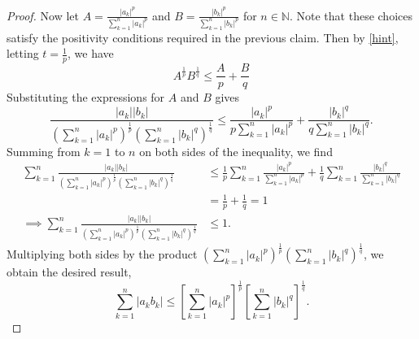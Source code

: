 \documentclass{article}
\begin{document}
\begin{proof}
	Now let $A=\frac{|a_k|^p}{\sum_{k=1}^{n}|a_k|^p}$ and $B = \frac{|b_k|^p}{\sum_{k=1}^{n}|b_k|^p}$ for $n\in\mathbb{N}$. Note that these choices satisfy the positivity conditions required in the previous claim. Then by \eqref{hint}, letting $t=\frac{1}{p}$, we have
	\begin{equation}
		A^\frac{1}{p}B^\frac{1}{q}\leq \frac{A}{p} + \frac{B}{q}
	\end{equation}
	Substituting the expressions for $A$ and $B$ gives 
	\begin{equation}
		\frac{|a_k||b_k|}{(\sum_{k=1}^{n}|a_k|^p)^{\frac{1}{p}}(\sum_{k=1}^{n}|b_k|^q)^{\frac{1}{q}}}\leq \frac{|a_k|^p}{p\sum_{k=1}^{n}|a_k|^p} + \frac{|b_k|^q}{q\sum_{k=1}^{n}|b_k|^q}.
	\end{equation}
	Summing from $k=1$ to $n$ on both sides of the inequality, we find
	\begin{align}
		\sum_{k=1}^{n}\frac{|a_k||b_k|}{(\sum_{k=1}^{n}|a_k|^p)^{\frac{1}{p}}(\sum_{k=1}^{n}|b_k|^q)^{\frac{1}{q}}}&\leq \frac{1}{p}\sum_{k=1}^{n}\frac{|a_k|^p}{\sum_{k=1}^{n}|a_k|^p} + \frac{1}{q}\sum_{k=1}^{n}\frac{|b_k|^q}{\sum_{k=1}^{n}|b_k|^q}\\
		&=\frac{1}{p} + \frac{1}{q}=1\\
		\implies \sum_{k=1}^{n}\frac{|a_k||b_k|}{(\sum_{k=1}^{n}|a_k|^p)^{\frac{1}{p}}(\sum_{k=1}^{n}|b_k|^q)^{\frac{1}{q}}}&\leq 1.
	\end{align}
	Multiplying both sides by the product $(\sum_{k=1}^{n}|a_k|^p)^{\frac{1}{p}}(\sum_{k=1}^{n}|b_k|^q)^{\frac{1}{q}}$, we obtain the desired result,
	\begin{equation}
		\sum_{k=1}^{n}|a_k b_k| \leq \left[\sum_{k=1}^{n}|a_k|^p\right]^{\frac{1}{p}}\left[\sum_{k=1}^{n}|b_k|^q\right]^{\frac{1}{q}}.
	\end{equation}
\end{proof}
\end{document}
